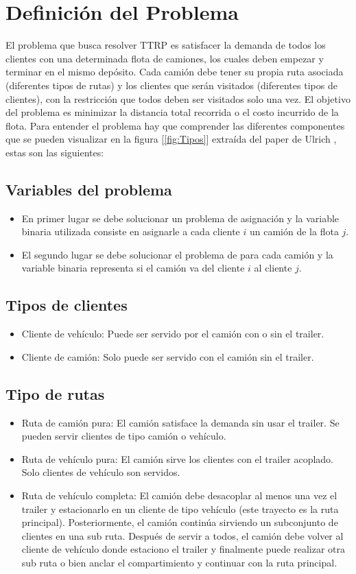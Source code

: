 \documentclass[letter, 10pt]{article}
\begin{document}
\section{Definici\'on del Problema}

 El problema que busca resolver TTRP es satisfacer la demanda de todos los clientes con una determinada flota de camiones, los cuales deben empezar y terminar en el mismo depósito. Cada camión debe tener su propia ruta asociada (diferentes tipos de rutas) y los clientes que serán visitados (diferentes tipos de clientes), con la restricción que todos deben ser visitados solo una vez. El objetivo del problema  es minimizar la distancia total recorrida o el costo incurrido de la flota. Para entender el problema hay que  comprender las diferentes componentes que se pueden visualizar en la figura [\ref{fig:Tipos}] extraída del paper de Ulrich \cite{Ulrich}, estas son las siguientes:
 \subsection{Variables del problema}
 \begin{itemize}
     \item En primer lugar se debe solucionar un problema de asignación y la variable binaria utilizada consiste en asignarle a cada cliente $i$ un camión de la flota $j$.
     \item El segundo lugar se debe solucionar el problema de  para cada camión y la  variable binaria representa si el camión va del cliente $i$ al cliente $j$.
 \end{itemize}
 \subsection{Tipos de clientes}
 \begin{itemize}
     \item Cliente de vehículo: Puede ser servido por el camión con o sin el trailer.
     \item Cliente de camión: Solo puede ser servido con el camión sin el trailer.
 \end{itemize}
 \subsection{Tipo de rutas}
 \begin{itemize}
     \item Ruta de camión pura: El camión satisface la demanda sin usar el  trailer. Se pueden servir clientes de tipo camión o vehículo.
     \item Ruta de vehículo pura: El camión sirve los clientes con el trailer acoplado. Solo clientes de vehículo son servidos.
     \item Ruta de vehículo completa: El camión debe desacoplar al menos una vez el trailer y estacionarlo en un cliente de tipo vehículo (este trayecto es la ruta principal). Posteriormente, el camión continúa sirviendo un subconjunto de clientes en una sub ruta. Después de servir a todos, el camión debe volver al cliente de vehículo donde estaciono el trailer y finalmente puede realizar otra sub ruta o bien anclar el compartimiento y continuar con la ruta principal.
 \end{itemize}
\end{document}
